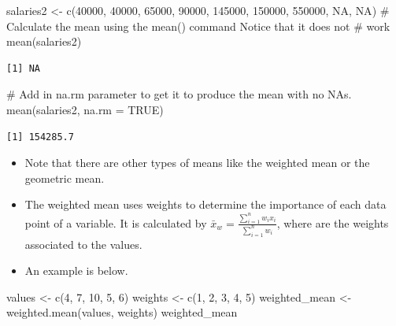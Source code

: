 \documentclass[
  letterpaper,
  DIV=11,
  numbers=noendperiod]{scrreprt}
\newenvironment{Shaded}{\begin{snugshade}}{\end{snugshade}}
\newcommand{\AttributeTok}[1]{\textcolor[rgb]{0.40,0.45,0.13}{#1}}
\newcommand{\CommentTok}[1]{\textcolor[rgb]{0.37,0.37,0.37}{#1}}
\newcommand{\ConstantTok}[1]{\textcolor[rgb]{0.56,0.35,0.01}{#1}}
\newcommand{\DecValTok}[1]{\textcolor[rgb]{0.68,0.00,0.00}{#1}}
\newcommand{\FunctionTok}[1]{\textcolor[rgb]{0.28,0.35,0.67}{#1}}
\newcommand{\NormalTok}[1]{\textcolor[rgb]{0.00,0.23,0.31}{#1}}
\newcommand{\OtherTok}[1]{\textcolor[rgb]{0.00,0.23,0.31}{#1}}
\providecommand{\tightlist}{%
  \setlength{\itemsep}{0pt}\setlength{\parskip}{0pt}}\usepackage{longtable,booktabs,array}
\begin{document}
\begin{Shaded}
\begin{Highlighting}[]
\NormalTok{salaries2 }\OtherTok{\textless{}{-}} \FunctionTok{c}\NormalTok{(}\DecValTok{40000}\NormalTok{, }\DecValTok{40000}\NormalTok{, }\DecValTok{65000}\NormalTok{, }\DecValTok{90000}\NormalTok{, }\DecValTok{145000}\NormalTok{, }\DecValTok{150000}\NormalTok{, }\DecValTok{550000}\NormalTok{, }\ConstantTok{NA}\NormalTok{,}
    \ConstantTok{NA}\NormalTok{)}
\CommentTok{\# Calculate the mean using the mean() command Notice that it does not}
\CommentTok{\# work}
\FunctionTok{mean}\NormalTok{(salaries2)}
\end{Highlighting}
\end{Shaded}

\begin{verbatim}
[1] NA
\end{verbatim}

\begin{Shaded}
\begin{Highlighting}[]
\CommentTok{\# Add in na.rm parameter to get it to produce the mean with no NAs.}
\FunctionTok{mean}\NormalTok{(salaries2, }\AttributeTok{na.rm =} \ConstantTok{TRUE}\NormalTok{)}
\end{Highlighting}
\end{Shaded}

\begin{verbatim}
[1] 154285.7
\end{verbatim}

\begin{itemize}
\tightlist
\item
  Note that there are other types of means like the weighted mean or the
  geometric mean.\\
\item
  The weighted mean uses weights to determine the importance of each
  data point of a variable. It is calculated by
  \(\bar{x}_w = \frac{\sum_{i=1}^{n} w_i x_i}{\sum_{i=1}^{n} w_i}\),
  where are the weights associated to the values.
\item
  An example is below.
\end{itemize}

\begin{Shaded}
\begin{Highlighting}[]
\NormalTok{values }\OtherTok{\textless{}{-}} \FunctionTok{c}\NormalTok{(}\DecValTok{4}\NormalTok{, }\DecValTok{7}\NormalTok{, }\DecValTok{10}\NormalTok{, }\DecValTok{5}\NormalTok{, }\DecValTok{6}\NormalTok{)}
\NormalTok{weights }\OtherTok{\textless{}{-}} \FunctionTok{c}\NormalTok{(}\DecValTok{1}\NormalTok{, }\DecValTok{2}\NormalTok{, }\DecValTok{3}\NormalTok{, }\DecValTok{4}\NormalTok{, }\DecValTok{5}\NormalTok{)}
\NormalTok{weighted\_mean }\OtherTok{\textless{}{-}} \FunctionTok{weighted.mean}\NormalTok{(values, weights)}
\NormalTok{weighted\_mean}
\end{Highlighting}
\end{Shaded}
\end{document}
